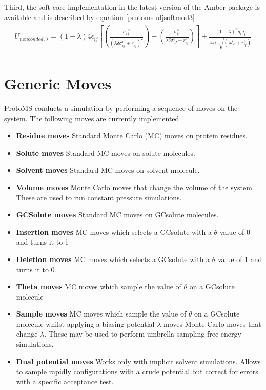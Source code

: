 \documentclass[letterpaper,10pt,english]{sphinxmanual}
\begin{document}
Third, the soft-core implementation in the latest version of the Amber package is available and is described by equation \eqref{protoms-uljsoftmod3}
\label{protoms:equation-uljsoftmod3}\begin{gather}
\begin{split}U_{non bonded,\lambda}= (1-\lambda) 4{\epsilon}_{ij} \left[ \left( \frac{ \sigma_{ij}^{12} }{ ( \lambda \delta \sigma_{ij}^6 + r_{ij}^{6} )^{2}} \right) - \left( \frac{ \sigma_{ij}^{6} }{ \lambda \delta \sigma_{iJ}^6 + r_{ij}^{6} } \right) \right] +  \frac{(1-\lambda)^{n} q_{i}q_{j}} {4\pi{\epsilon}_{0} \sqrt{( \lambda \delta_c +  r_{ij}^{2})}}\end{split}\label{protoms-uljsoftmod3}
\end{gather}

\section{Generic Moves}
\label{protoms:generic-moves}
ProtoMS conducts a simulation by performing a sequence of moves on the system. The following moves are currently implemented
\begin{itemize}
\item {} 
\textbf{Residue moves} Standard Monte Carlo (MC) moves on protein residues.

\item {} 
\textbf{Solute moves} Standard MC moves on solute molecules.

\item {} 
\textbf{Solvent moves} Standard MC moves on solvent molecule.

\item {} 
\textbf{Volume moves} Monte Carlo moves that change the volume of the system. These are used to run constant pressure simulations.

\item {} 
\textbf{GCSolute moves} Standard MC moves on GCsolute molecules.

\item {} 
\textbf{Insertion moves} MC moves which selects a GCsolute with a \(\theta\) value of 0 and turns it to 1

\item {} 
\textbf{Deletion moves} MC moves which selects a GCsolute with a \(\theta\) value of 1 and turns it to 0

\item {} 
\textbf{Theta moves} MC moves which sample the value of \(\theta\) on a GCsolute molecule

\item {} 
\textbf{Sample moves} MC moves which sample the value of \(\theta\) on a GCsolute molecule whilst applying a biasing potential \(\lambda\)-moves Monte Carlo moves that change \(\lambda\). These may be used to perform umbrella sampling free energy simulations.

\item {} 
\textbf{Dual potential moves} Works only with implicit solvent simulations. Allows to sample rapidly configurations with a crude potential but correct for errors with a specific acceptance test.

\end{itemize}
\end{document}
